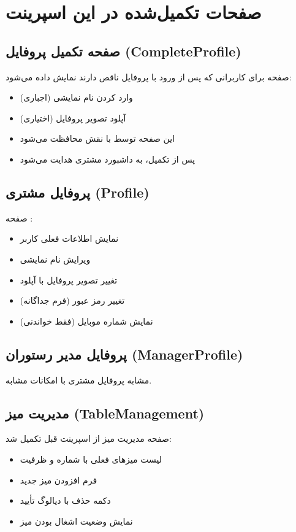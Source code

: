 \documentclass[12pt, a4paper]{article}
\begin{document}
\newpage

\section{صفحات تکمیل‌شده در این اسپرینت}

\subsection{صفحه تکمیل پروفایل (CompleteProfile)}
صفحه  برای کاربرانی که پس از ورود با  پروفایل
ناقص دارند نمایش داده می‌شود:

\begin{itemize}[rightmargin=0.5cm]
  \item وارد کردن نام نمایشی (اجباری)
  \item آپلود تصویر پروفایل (اختیاری)
  \item این صفحه توسط  با نقش  محافظت می‌شود
  \item پس از تکمیل، به داشبورد مشتری هدایت می‌شود
\end{itemize}

\subsection{پروفایل مشتری (Profile)}
صفحه :
\begin{itemize}[rightmargin=0.5cm]
  \item نمایش اطلاعات فعلی کاربر
  \item ویرایش نام نمایشی
  \item تغییر تصویر پروفایل با آپلود
  \item تغییر رمز عبور (فرم جداگانه)
  \item نمایش شماره موبایل (فقط خواندنی)
\end{itemize}

\subsection{پروفایل مدیر رستوران (ManagerProfile)}
مشابه پروفایل مشتری با امکانات مشابه.

\subsection{مدیریت میز (TableManagement)}
صفحه مدیریت میز از اسپرینت قبل تکمیل شد:
\begin{itemize}[rightmargin=0.5cm]
  \item لیست میزهای فعلی با شماره و ظرفیت
  \item فرم افزودن میز جدید
  \item دکمه حذف با دیالوگ تأیید
  \item نمایش وضعیت اشغال بودن میز
\end{itemize}
\end{document}

